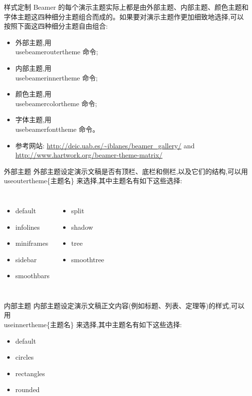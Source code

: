 \begin{frame}{样式定制}
Beamer 的每个演示主题实际上都是由外部主题、内部主题、颜色主题和字体主题这四种细分主题组合而成的。如果要对演示主题作更加细致地选择,可以按照下面这四种细分主题自由组合:

\begin{itemize}
    \item 外部主题,用 \\usebeameroutertheme 命令;
    \item 内部主题,用 \\usebeamerinnertheme 命令;
    \item 颜色主题,用 \\usebeamercolortheme 命令;
    \item 字体主题,用 \\usebeamerfonttheme 命令。
    \item 参考网站: \url{http://deic.uab.es/~iblanes/beamer_gallery/} and \url{http://www.hartwork.org/beamer-theme-matrix/}

\end{itemize}
\end{frame}

\begin{frame}{外部主题}
外部主题设定演示文稿是否有顶栏、底栏和侧栏,以及它们的结构,可以用 \\useoutertheme\{主题名\} 来选择,其中主题名有如下这些选择:

\begin{columns}
    \column{3cm}
    \begin{itemize}
        \item default
        \item infolines
        \item miniframes
        \item sidebar
        \item smoothbars
    \end{itemize}

    \column{5cm}
    \begin{itemize}
        \item split
        \item shadow
        \item tree
        \item smoothtree
    \end{itemize}
\end{columns}
\end{frame}

\begin{frame}{内部主题}
内部主题设定演示文稿正文内容(例如标题、列表、定理等)的样式,可以用 \\useinnertheme\{主题名\} 来选择,其中主题名有如下这些选择:
\begin{itemize}
    \item default
    \item circles
    \item rectangles
    \item rounded
\end{itemize}
\end{frame}

